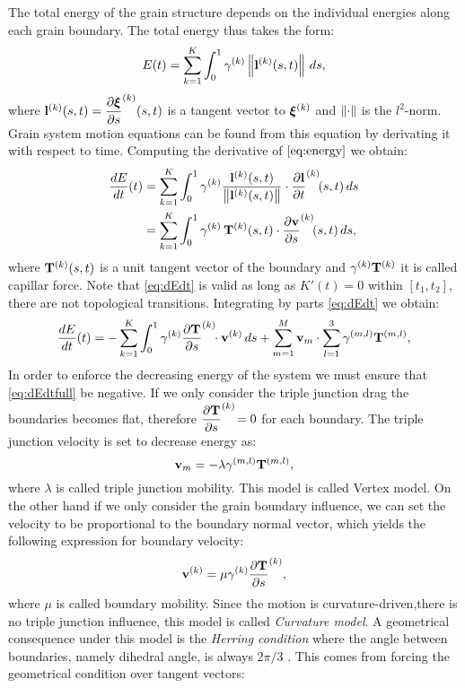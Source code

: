 The total energy of the grain structure depends on the individual energies along each grain boundary. The total energy thus takes the form:
\begin{equation}
    E(t) = \sum_{k=1}^{K} \int_0^1 \gamma ^{(k)}\left\lVert\mathbf{l}^{(k)}(s,t)\right\rVert\, ds,
    \label{eq:energy}
\end{equation}
where $\mathbf{l}^{(k)}(s,t) = \dfrac{\partial \bm{\xi}}{\partial s}^{(k)}(s,t)$ is a tangent vector to $\bm{\xi}^{(k)}$ and $\left\lVert\cdot\right\rVert$ is the $l^2$-norm. Grain system motion equations can be found from this equation by derivating it with respect to time. Computing the derivative of $\eqref{eq:energy}$ we obtain:
\begin{align}
    \dfrac{dE}{dt}(t) &= \sum_{k=1}^{K} \int_0^1 \gamma^{(k)} \dfrac{\mathbf{l}^{(k)}(s,t)}{\left\lVert\mathbf{l}^{(k)}(s,t)\right\rVert} \cdot \dfrac{\partial \mathbf{l}}{\partial t}^{(k)}\!(s,t) \, ds \nonumber\\
    &= \sum_{k=1}^{K} \int_0^1 \gamma^{(k)}\, \mathbf{T}^{(k)}(s,t) \cdot \dfrac{\partial \mathbf{v}}{\partial s}^{(k)}\!(s,t) \, ds \label{eq:dEdt},
\end{align}
where $\mathbf{T}^{(k)}(s,t)$ is a unit tangent vector of the boundary and $\gamma^{(k)}\mathbf{T}^{(k)}$ it is called capillar force. Note that \eqref{eq:dEdt} is valid as long as $K'(t) = 0$ within $[t_1, t_2]$, \ie
there are not topological transitions. Integrating by parts \eqref{eq:dEdt} we obtain:
\begin{equation}
    \dfrac{dE}{dt}(t) = -\sum_{k=1}^K \int_0^1 \gamma^{(k)}\dfrac{\partial \mathbf{T}}{\partial s}^{(k)}\!\!\cdot \mathbf{v}^{(k)}\, ds + \sum_{m=1}^M \mathbf{v}_m \cdot \sum_{l=1}^{3} \gamma^{(m,l)}\mathbf{T}^{(m,l)}
    \label{eq:dEdtfull},
\end{equation}
In order to enforce the decreasing energy of the system we must ensure that \eqref{eq:dEdtfull} be negative. 
If we only consider the triple junction drag the boundaries becomes flat, therefore $\dfrac{\partial \mathbf{T}}{\partial s}^{(k)}\! = 0$ for each boundary. The triple junction velocity is set to decrease energy as:
\begin{equation*}
    \mathbf{v}_{m} = - \lambda \gamma^{(m,l)}\mathbf{T}^{(m,l)},
\end{equation*}
where $\lambda$ is called triple junction mobility. This model is called Vertex model. On the other hand if we only consider the grain boundary influence, we can set the velocity to be proportional to the boundary normal vector, which yields the following expression for boundary velocity:
\begin{equation*}
    \mathbf{v}^{(k)} = \mu \gamma^{(k)} \dfrac{\partial \mathbf{T}}{\partial s}^{(k)},
\end{equation*}
where $\mu$ is called boundary mobility. Since the motion is curvature-driven,\ie there is no triple junction influence, this model is called \emph{Curvature model}. A geometrical consequence under this model is the \emph{Herring condition} where the angle between boundaries, namely dihedral angle, is always $2\pi/3$ \cite{herring1951surface}. This comes from forcing the geometrical condition over tangent vectors:
